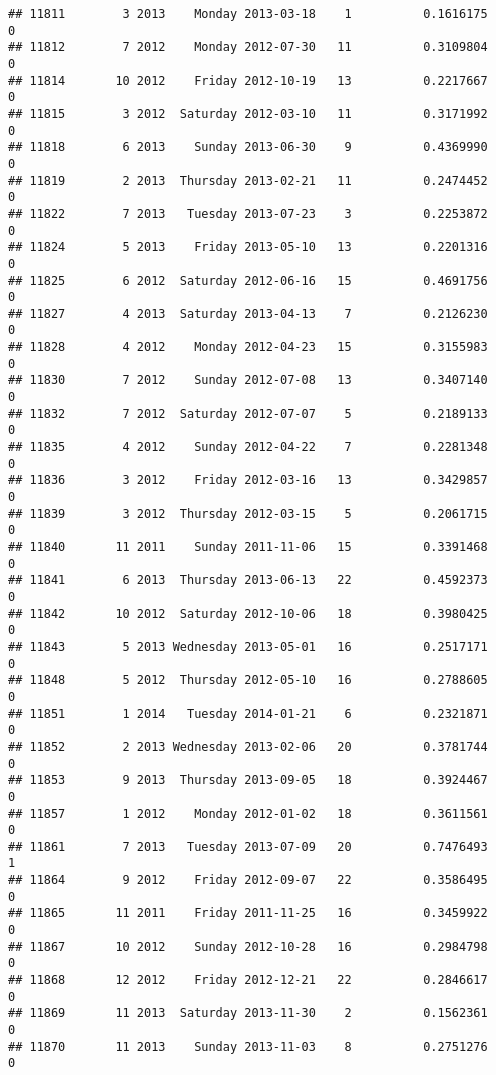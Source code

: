 \documentclass[
]{article}
\begin{document}
\begin{verbatim}
## 11811        3 2013    Monday 2013-03-18    1          0.1616175             0
## 11812        7 2012    Monday 2012-07-30   11          0.3109804             0
## 11814       10 2012    Friday 2012-10-19   13          0.2217667             0
## 11815        3 2012  Saturday 2012-03-10   11          0.3171992             0
## 11818        6 2013    Sunday 2013-06-30    9          0.4369990             0
## 11819        2 2013  Thursday 2013-02-21   11          0.2474452             0
## 11822        7 2013   Tuesday 2013-07-23    3          0.2253872             0
## 11824        5 2013    Friday 2013-05-10   13          0.2201316             0
## 11825        6 2012  Saturday 2012-06-16   15          0.4691756             0
## 11827        4 2013  Saturday 2013-04-13    7          0.2126230             0
## 11828        4 2012    Monday 2012-04-23   15          0.3155983             0
## 11830        7 2012    Sunday 2012-07-08   13          0.3407140             0
## 11832        7 2012  Saturday 2012-07-07    5          0.2189133             0
## 11835        4 2012    Sunday 2012-04-22    7          0.2281348             0
## 11836        3 2012    Friday 2012-03-16   13          0.3429857             0
## 11839        3 2012  Thursday 2012-03-15    5          0.2061715             0
## 11840       11 2011    Sunday 2011-11-06   15          0.3391468             0
## 11841        6 2013  Thursday 2013-06-13   22          0.4592373             0
## 11842       10 2012  Saturday 2012-10-06   18          0.3980425             0
## 11843        5 2013 Wednesday 2013-05-01   16          0.2517171             0
## 11848        5 2012  Thursday 2012-05-10   16          0.2788605             0
## 11851        1 2014   Tuesday 2014-01-21    6          0.2321871             0
## 11852        2 2013 Wednesday 2013-02-06   20          0.3781744             0
## 11853        9 2013  Thursday 2013-09-05   18          0.3924467             0
## 11857        1 2012    Monday 2012-01-02   18          0.3611561             0
## 11861        7 2013   Tuesday 2013-07-09   20          0.7476493             1
## 11864        9 2012    Friday 2012-09-07   22          0.3586495             0
## 11865       11 2011    Friday 2011-11-25   16          0.3459922             0
## 11867       10 2012    Sunday 2012-10-28   16          0.2984798             0
## 11868       12 2012    Friday 2012-12-21   22          0.2846617             0
## 11869       11 2013  Saturday 2013-11-30    2          0.1562361             0
## 11870       11 2013    Sunday 2013-11-03    8          0.2751276             0

\end{verbatim}
\end{document}

